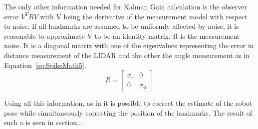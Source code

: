 The only other information needed for Kalman Gain calculation is the observer error $ V^TRV $ with V being the derivative of the measurement model with respect to noise. If all landmarks are assumed to be uniformly affected by noise, it is reasonable to approximate V to be an identity matrix. R is the measurement noise. It is a diagonal matrix with one of the eigenvalues representing the error in distance measurement of the LIDAR and the other the angle measurement as in Equation~\ref{eq:SpikeMath5}. 
\begin{equation}
\label{eq:SpikeMath5}
R = 
\begin{bmatrix}
\sigma_r & 0 \\
0 & \sigma_\alpha
\end{bmatrix}
\end{equation}

Using all this information, as in it is possible to correct the estimate of the robot pose while simultaneously correcting the position of the landmarks. The result of such a \slam is seen in section...